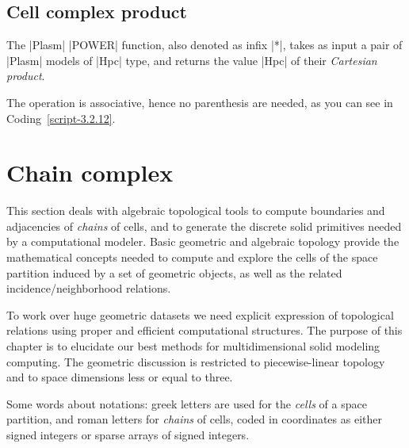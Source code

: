 \subsection*{Cell complex product}
\label{subsec:6:cell-product}

\begin{definition}[larprod]
The |Plasm| |POWER| function, also denoted as infix |*|, takes as input a pair of |Plasm| models of |Hpc| type, and returns the value |Hpc| of their \emph{Cartesian product}. 
\end{definition}
The operation is associative, hence no parenthesis are needed, as you can see in Coding~\ref{script-3.2.12}.



\section{Chain complex}\label{sect:3-3}

This section deals with algebraic topological tools to compute boundaries and adjacencies of \emph{chains} of cells, and  to generate the discrete solid primitives needed by a  computational modeler. 
Basic geometric and algebraic topology  
provide the mathematical concepts needed to compute
and explore the cells of the space partition induced by a set of
geometric objects, as well as the related incidence/neighborhood relations. 


To work over huge geometric datasets we need explicit expression of topological relations using proper and efficient computational structures.
The purpose of this chapter is to elucidate our best methods for multidimensional solid modeling computing.
The geometric discussion is restricted to piecewise-linear topology and to space dimensions less or equal to three.

Some words about  notations:  greek letters are used for the \emph{cells} of a space partition, and roman letters for  \emph{chains} of cells, coded in coordinates as either signed integers or sparse arrays of signed integers.  


